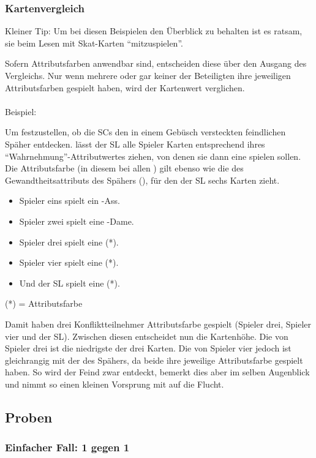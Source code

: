 \subsubsection {Kartenvergleich}

Kleiner Tip: Um bei diesen Beispielen den Überblick zu behalten ist es ratsam, sie beim Lesen mit Skat-Karten "`mitzuspielen"'.

Sofern Attributsfarben anwendbar sind, entscheiden diese über den Ausgang des Vergleichs. Nur wenn mehrere oder gar keiner der Beteiligten ihre jeweiligen Attributsfarben gespielt haben, wird der Kartenwert verglichen.
\\
\\
Beispiel:

Um festzustellen, ob die SCs den in einem Gebüsch versteckten feindlichen Späher entdecken. lässt der SL alle Spieler Karten entsprechend ihres "`Wahrnehmung"'-Attributwertes ziehen, von denen sie dann eine spielen sollen. Die Attributsfarbe (in diesem bei allen \karo) gilt ebenso wie die des Gewandtheitsattributs des Spähers (\pik), für den der SL sechs Karten zieht.
\begin {itemize}
\item Spieler eins spielt ein \kreuz-Ass.
\item Spieler zwei spielt eine \herz-Dame.
\item Spieler drei spielt eine  (*).
\item Spieler vier spielt eine  (*).
\item Und der SL spielt eine  (*).
\end {itemize}
(*) = Attributsfarbe

Damit haben drei Konfliktteilnehmer Attributsfarbe gespielt (Spieler drei, Spieler vier und der SL). Zwischen diesen entscheidet nun die Kartenhöhe. Die  von Spieler drei ist die niedrigste der drei Karten. Die  von Spieler vier jedoch ist gleichrangig mit der  des Spähers, da beide ihre jeweilige Attributsfarbe gespielt haben. So wird der Feind zwar entdeckt, bemerkt dies aber im selben Augenblick und nimmt so einen kleinen Vorsprung mit auf die Flucht.

\twocolumn
\subsection {Proben}
\subsubsection {Einfacher Fall: 1 gegen 1}

